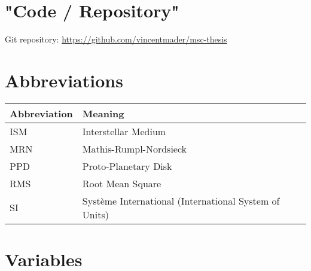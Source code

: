 \section{"Code / Repository"}

Git repository:
\url{https://github.com/vincentmader/msc-thesis} %

\section{Abbreviations}

    \begin{table}[h!]
        \begin{tabular}{|l|l|}
            \hline
            \textbf{Abbreviation}   & \textbf{Meaning} \\
            \hline
            ISM                     & Interstellar Medium \\
            \hline
            MRN                     & Mathis-Rumpl-Nordsieck \\
            \hline
            PPD                     & Proto-Planetary Disk \\
            \hline
            RMS                     & Root Mean Square \\
            \hline
            SI                      & Système International (International System of Units) \\
            \hline                  %
        \end{tabular}
    \end{table}

\section{Variables}

